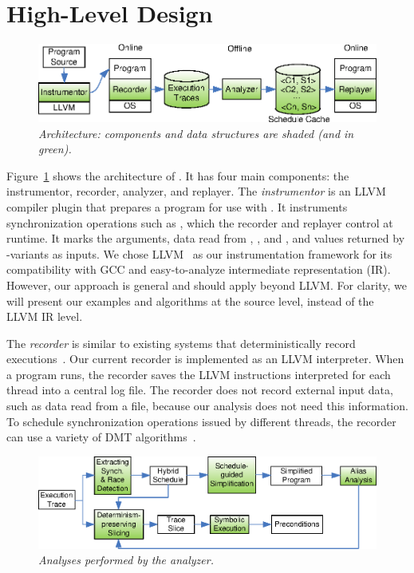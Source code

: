 \section{High-Level Design} \label{sec:peregrine-design}

\begin{figure}[t]
\centering
\includegraphics[width=.7\columnwidth]{peregrine/figures/overview.eps}
\caption{{\em \peregrine Architecture: components and data structures are
    shaded (and in green).}}\label{fig:peregrine-arch}
\end{figure}


Figure~\ref{fig:peregrine-arch} shows the architecture of \peregrine.  It has four main
components: the instrumentor, recorder, analyzer, and
replayer.  The \emph{instrumentor} is an LLVM~\cite{llvm} compiler plugin
that prepares a program for use with \peregrine.  It instruments synchronization
operations such as , which the recorder and
replayer control at runtime.  It marks the  arguments, data read
from , , and , and values
returned by -variants as
inputs.  We chose LLVM~\cite{llvm} as our instrumentation framework for
its compatibility with GCC and easy-to-analyze intermediate representation
(IR).  However, our approach is general and should apply beyond LLVM.
For clarity, we will present our examples and algorithms at the
source level, instead of the LLVM IR level.

The \emph{recorder} is similar to existing systems that deterministically
record executions~\cite{scribe:sigmetrics10,idna:vee06,smp-revirt:vee08}.
Our current recorder is implemented as an LLVM interpreter.  When a
program runs, the recorder saves the LLVM instructions interpreted for
each thread into a central log file.  The recorder does not record
external input data, such as data read from a file, because our
analysis does not need this information.  To schedule synchronization
operations issued by different threads, the recorder can use a variety of
DMT algorithms~\cite{cui:tern:osdi10}.  


\begin{figure}
\centering
\includegraphics[width=0.7\columnwidth]{peregrine/figures/analyzer.eps}
\caption{{\em Analyses performed by the analyzer.}}\label{fig:peregrine-analyzer}
\end{figure}

